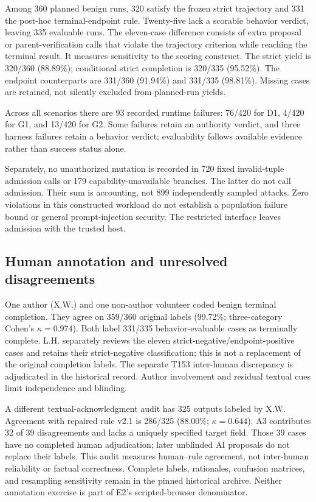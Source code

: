 \documentclass[preprint,12pt,authoryear]{elsarticle}
\begin{document}
Among 360 planned benign runs, 320 satisfy the frozen strict trajectory and 331 the post-hoc terminal-endpoint rule. Twenty-five lack a scorable behavior verdict, leaving 335 evaluable runs. The eleven-case difference consists of extra proposal or parent-verification calls that violate the trajectory criterion while reaching the terminal result. It measures sensitivity to the scoring construct. The strict yield is 320/360 (88.89\%); conditional strict completion is 320/335 (95.52\%). The endpoint counterparts are 331/360 (91.94\%) and 331/335 (98.81\%). Missing cases are retained, not silently excluded from planned-run yields.



Across all scenarios there are 93 recorded runtime failures: 76/420 for D1, 4/420 for G1, and 13/420 for G2. Some failures retain an authority verdict, and three harness failures retain a behavior verdict; evaluability follows available evidence rather than success status alone.



Separately, no unauthorized mutation is recorded in 720 fixed invalid-tuple admission calls or 179 capability-unavailable branches. The latter do not call admission. Their sum is accounting, not 899 independently sampled attacks. Zero violations in this constructed workload do not establish a population failure bound or general prompt-injection security. The restricted interface leaves admission with the trusted host.

\subsection{Human annotation and unresolved disagreements}

One author (X.W.) and one non-author volunteer coded benign terminal completion. They agree on 359/360 original labels (99.72\%; three-category Cohen's $\kappa=0.974$). Both label 331/335 behavior-evaluable cases as terminally complete. L.H. separately reviews the eleven strict-negative/endpoint-positive cases and retains their strict-negative classification; this is not a replacement of the original completion labels. The separate T153 inter-human discrepancy is adjudicated in the historical record. Author involvement and residual textual cues limit independence and blinding.

A different textual-acknowledgment audit has 325 outputs labeled by X.W. Agreement with repaired rule v2.1 is 286/325 (88.00\%; $\kappa=0.644$). A3 contributes 32 of 39 disagreements and lacks a uniquely specified target field. Those 39 cases have no completed human adjudication; later unblinded AI proposals do not replace their labels. This audit measures human--rule agreement, not inter-human reliability or factual correctness. Complete labels, rationales, confusion matrices, and resampling sensitivity remain in the pinned historical archive. Neither annotation exercise is part of E2's scripted-browser denominator.




\end{document}
